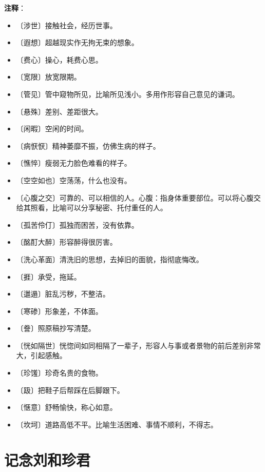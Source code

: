 \documentclass[12pt,UTF-8,openany]{ctexbook}
\begin{document}
\newpage

\textbf{注释}：

\vspace{-1em}

\begin{itemize}
    \setlength\itemsep{-0.2em}
    \item 〔涉世〕接触社会，经历世事。
    \item 〔遐想〕超越现实作无拘无束的想象。
    \item 〔费心〕操心，耗费心思。
    \item 〔宽限〕放宽限期。
    \item 〔管见〕管中窥物所见，比喻所见浅小。多用作形容自己意见的谦词。
    \item 〔悬殊〕差别、差距很大。
    \item 〔闲暇〕空闲的时间。
    \item 〔病恹恹〕精神萎靡不振，仿佛生病的样子。
    \item 〔憔悴〕瘦弱无力脸色难看的样子。
    \item 〔空空如也〕空荡荡，什么也没有。
    \item 〔心腹之交〕可靠的、可以相信的人。心腹：指身体重要部位。可以将心腹交给其照看，比喻可以分享秘密、托付重任的人。
    \item 〔孤苦伶仃〕孤独而困苦，没有依靠。
    \item 〔酩酊大醉〕形容醉得很厉害。
    \item 〔洗心革面〕清洗旧的思想，去掉旧的面貌，指彻底悔改。
    \item 〔捱〕承受，拖延。
    \item 〔邋遢〕脏乱污秽，不整洁。
    \item 〔寒碜〕形象差，不体面。
    \item 〔誊〕照原稿抄写清楚。
    \item 〔恍如隔世〕恍惚间如同相隔了一辈子，形容人与事或者景物的前后差别非常大，引起感触。
    \item 〔珍馐〕珍奇名贵的食物。
    \item 〔趿〕把鞋子后帮踩在后脚跟下。
    \item 〔惬意〕舒畅愉快，称心如意。
    \item 〔坎坷〕道路高低不平。比喻生活困难、事情不顺利，不得志。
\end{itemize}

\chapter{记念刘和珍君}
\end{document}
